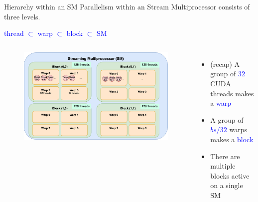 \documentclass[dvipdfmx, 11pt, aspectratio=169]{beamer}   %
\begin{document}
\begin{frame}{Hierarchy within an SM}
  Parallelism within an Stream Multiprocessor consists of three levels.

  \textcolor{blue}{
  thread $\subset$ warp $\subset$ block $\subset$ SM 
  }
  \begin{columns}
    \begin{figure}
      \includegraphics[scale=0.075]{img/smHierarchy.png}
    \end{figure}
    \begin{itemize}
      \item (recap) A group of \textcolor{blue}{$32$} CUDA threads makes a \textcolor{blue}{warp}
      \item A group of \textcolor{blue}{$bs/32$} warps makes a \textcolor{blue}{block}
      \item There are multiple blocks active on a single SM
    \end{itemize}
  \end{columns}
\end{frame}
\end{document}
